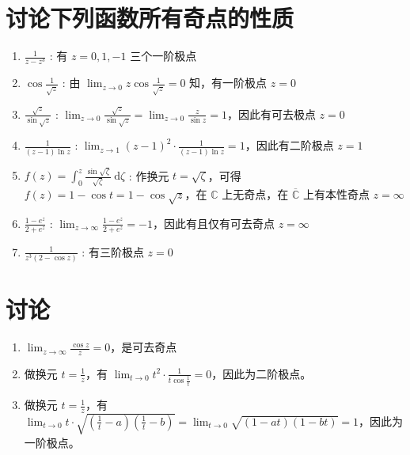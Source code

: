 \documentclass[UTF8]{report}
\def\C{\mathbb{C}}
\theoremstyle{MyLineTheoremStyle} %
\theoremstyle{MyBlockTheoremStyle} %
\theoremstyle{MySubsubsectionStyle} %
\begin{document}
\section{讨论下列函数所有奇点的性质}
\begin{enumerate}
\item $\frac{1}{z - z^3}$ : 
有 $z = 0, 1, -1$ 三个一阶极点
\item $\cos \frac{1}{\sqrt{z}}$ : 
由 $\lim_{z\to 0} z\cos \frac{1}{\sqrt{z}} = 0$ 知，有一阶极点 $z=0$
\item $\frac{\sqrt{z}}{\sin \sqrt{z}}$ : 
$\lim_{z\to 0} \frac{\sqrt{z}}{\sin \sqrt{z}} = \lim_{z\to 0}\frac{z}{\sin z} = 1$，因此有可去极点 $z = 0$ 
\item $\frac{1}{(z-1)\ln z}$ : 
$\lim_{z\to 1} (z-1)^2\cdot \frac{1}{(z-1)\ln z} = 1$，因此有二阶极点 $z=1$
\item $f(z) = \int_{0}^{z} \frac{\sin \sqrt{\zeta}}{\sqrt{\zeta}} \ \mathrm{d}\zeta$ : 
作换元 $t = \sqrt{\zeta}$，可得 $f(z) = 1 - \cos t = 1 - \cos \sqrt{z}$，在 $\C$ 上无奇点，在 $\overline{\C}$ 上有本性奇点 $z = \infty$
\item $\frac{1 - e^z}{2 + e^z}$ : 
$\lim_{z\to \infty} \frac{1 - e^z}{2 + e^z} = -1$，因此有且仅有可去奇点 $z = \infty$
\item $\frac{1}{z^3(2 - \cos z)}$ : 有三阶极点 $z = 0$
\end{enumerate}

\section{讨论}
\begin{enumerate}
\item $\lim_{z\to \infty} \frac{\cos z}{z} = 0$，是可去奇点
\item 做换元 $t =  \frac{1}{z}$，有 $\lim_{t\to 0} t^2\cdot \frac{1}{t\cos \frac{1}{t}} = 0$，因此为二阶极点。
\item 做换元 $t =  \frac{1}{z}$，有 $\lim_{t \to 0} t \cdot \sqrt{\left(\frac{1}{t} - a\right)\left(\frac{1}{t} - b\right)} = \lim_{t \to 0} \sqrt{(1 - at)(1-bt)} = 1$，因此为一阶极点。
\end{enumerate}
\end{document}
